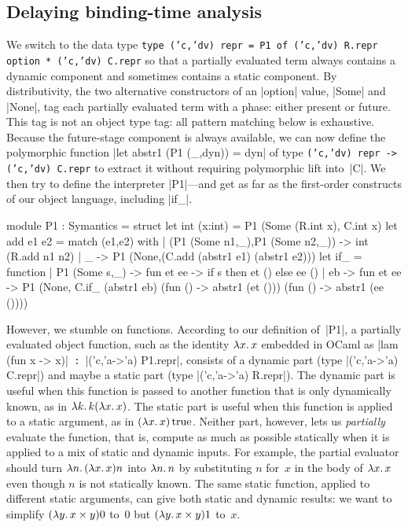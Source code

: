 \subsection{Delaying binding-time analysis}
\label{S:PE-problem}

We switch to the data type
\texttt{type ('c,'dv) repr = P1 of ('c,'dv) R.repr option * ('c,'dv) C.repr}
so that a partially evaluated term always contains a dynamic
component and sometimes contains a static component.  By 
distributivity, the two
alternative constructors of an |option| value, |Some| and |None|,
tag each partially evaluated term with a phase: either present or
future.  This tag is not an object type tag: all pattern matching below
is exhaustive.  Because the future-stage component is always available, we
can now define the polymorphic function
|let abstr1 (P1 (_,dyn)) = dyn| of type
\texttt{('c,'dv) repr -> ('c,'dv) C.repr}
to extract it without requiring polymorphic lift into~|C|.  We then try
to define the interpreter |P1|---and get as far as the first-order
constructs of our object language, including |if_|.
\begin{code3}
module P1 : Symantics = struct
  let int (x:int) = P1 (Some (R.int x), C.int x)
  let add e1 e2 = match (e1,e2) with
    | (P1 (Some n1,_),P1 (Some n2,_)) -> int (R.add n1 n2)
    | _ -> P1 (None,(C.add (abstr1 e1) (abstr1 e2)))
  let if_ = function
    | P1 (Some s,_) -> fun et ee -> if s then et () else ee ()
    | eb -> fun et ee -> P1 (None, C.if_ (abstr1 eb) 
                                   (fun () -> abstr1 (et ()))
                                   (fun () -> abstr1 (ee ())))
\end{code3}
However, we stumble on functions.  According to our
definition of~|P1|, a partially evaluated object function, such as the
identity $\mathopen{\lambda\mathord{x}.\,}x$ embedded in OCaml as |lam (fun x -> x)|\texttt{ :
}|('c,'a->'a) P1.repr|, consists of a dynamic part 
(type |('c,'a->'a) C.repr|) and
maybe a static part (type |('c,'a->'a) R.repr|).  The dynamic part is useful
when this function is passed to another function that is only
dynamically known, as in $\mathopen{\lambda\mathord{k}.\,}k(\mathopen{\lambda\mathord{x}.\,}x)$.  The static part is
useful when this function is applied to a static argument, as in
$(\mathopen{\lambda\mathord{x}.\,}x)\mathinner{\mathrm{true}}$.  Neither part, however, lets us \emph{partially}
evaluate the function, that is, compute as much as possible statically
when it is applied to a mix of static and dynamic inputs.  For example,
the partial evaluator should turn $\mathopen{\lambda\mathord{n}.\,}(\mathopen{\lambda\mathord{x}.\,}x)n$ into $\mathopen{\lambda\mathord{n}.\,}n$
by substituting $n$ for~$x$ in the body of $\mathopen{\lambda\mathord{x}.\,}x$ even though $n$ is
not statically known.  The same static function, applied to
different static arguments, can give both static and dynamic results: we
want to simplify $(\mathopen{\lambda\mathord{y}.\,}x\times y)0$ to~$0$ but $(\mathopen{\lambda\mathord{y}.\,}x\times y)1$
to~$x$.

